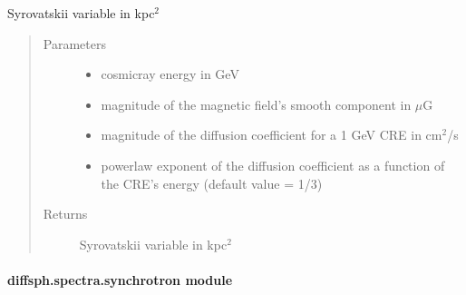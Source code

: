 \documentclass[letterpaper,10pt,english]{sphinxmanual}
\begin{document}

\begin{fulllineitems}
\label{\detokenize{diffsph.spectra:diffsph.spectra.analytics.lam}}
\sphinxAtStartPar
Syrovatskii variable in kpc$^{\text{2}}$
\begin{quote}\begin{description}
\item[{Parameters}] \leavevmode\begin{itemize}
\item {} 
\sphinxAtStartPar
{} \textendash{} cosmic\sphinxhyphen{}ray energy in GeV

\item {} 
\sphinxAtStartPar
{} \textendash{} magnitude of the magnetic field’s smooth component in \(\mu\)G

\item {} 
\sphinxAtStartPar
{} \textendash{} magnitude of the diffusion coefficient for a 1 GeV CRE in cm$^{\text{2}}$/s

\item {} 
\sphinxAtStartPar
{} \textendash{} power\sphinxhyphen{}law exponent of the diffusion coefficient as a function of the CRE’s energy (default value = 1/3)

\end{itemize}

\item[{Returns}] \leavevmode
\sphinxAtStartPar
Syrovatskii variable in kpc$^{\text{2}}$

\end{description}\end{quote}

\end{fulllineitems}



\paragraph{diffsph.spectra.synchrotron module}
\label{\detokenize{diffsph.spectra:module-diffsph.spectra.synchrotron}}\label{\detokenize{diffsph.spectra:diffsph-spectra-synchrotron-module}}
\end{document}
